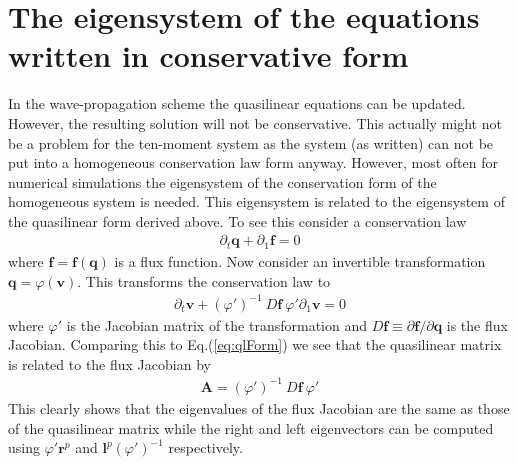 \documentclass[11pt, reqno]{amsart}
\newcommand{\eqr}[1]{Eq.\thinspace(#1)}
\newcommand{\mvec}[1]{\mathbf{#1}}
\theoremstyle{definition}
\begin{document}
\section{The eigensystem of the equations written in conservative form}

In the wave-propagation scheme the quasilinear equations can be
updated. However, the resulting solution will not be
conservative. This actually might not be a problem for the ten-moment
system as the system (as written) can not be put into a homogeneous
conservation law form anyway. However, most often for numerical
simulations the eigensystem of the conservation form of the homogeneous
system is needed. This eigensystem is related to the eigensystem of
the quasilinear form derived above. To see this consider a
conservation law
\begin{align}
  \partial_t \mvec{q} + \partial_1 \mvec{f} = 0
\end{align}
where $\mvec{f} = \mvec{f}(\mvec{q})$ is a flux function. Now consider
an invertible transformation $\mvec{q} = \varphi(\mvec{v})$. This
transforms the conservation law to
\begin{align}
  \partial_t \mvec{v} 
  + (\varphi')^{-1}\ D\mvec{f}\ \varphi' \partial_1 \mvec{v} = 0
\end{align}
where $\varphi'$ is the Jacobian matrix of the transformation and $D\mvec{f}
\equiv \partial \mvec{f}/\partial \mvec{q}$ is the flux
Jacobian. Comparing this to \eqr{\ref{eq:qlForm}} we see that the
quasilinear matrix is related to the flux Jacobian by
\begin{align}
  \mvec{A} = (\varphi')^{-1}\ D\mvec{f}\ \varphi'
\end{align}
This clearly shows that the eigenvalues of the flux Jacobian are the
same as those of the quasilinear matrix while the right and left
eigenvectors can be computed using $\varphi' \mvec{r}^p$ and
$\mvec{l}^p(\varphi')^{-1} $ respectively.
\end{document}
